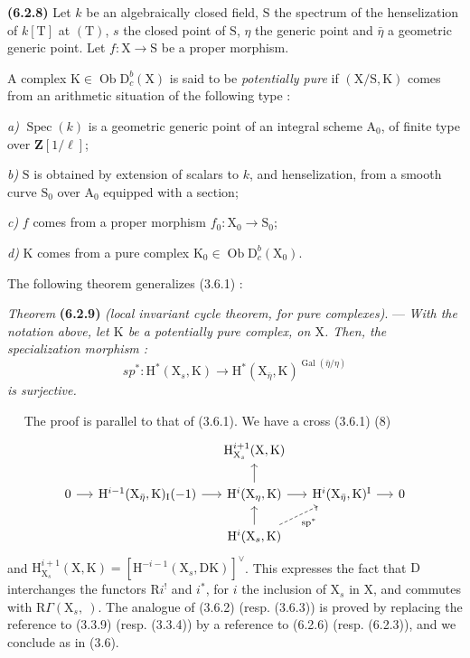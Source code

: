 \documentclass[11pt,leqno]{article}
\newcommand{\Page}[1]{\ifvmode\noindent\else\unskip\ \fi{\footnotesize\textcolor{gray}{[p.\,#1]}}\ \ignorespaces}
\begin{document}
\textbf{(6.2.8)} Let \(k\) be an algebraically closed field,
\(\mathrm{S}\) the spectrum of the henselization of \(k[\mathrm{T}]\) at
\((\mathrm{T})\), \(s\) the closed point of \(\mathrm{S}\), \(\eta\)
the generic point and \(\bar{\eta}\) a geometric generic point.
Let \(f:\mathrm{X}\to\mathrm{S}\) be a proper morphism.

A complex \(\mathrm{K}\in\operatorname{Ob}\mathrm{D}_c^b(\mathrm{X})\)
is said to be \textit{potentially pure} if
\((\mathrm{X}/\mathrm{S},\mathrm{K})\) comes from an arithmetic
situation of the following type :

\textit{a)} \(\operatorname{Spec}(k)\) is a geometric generic
point of an integral scheme \(\mathrm{A}_0\), of finite type over
\(\mathbf{Z}[1/\ell]\);

\textit{b)} \(\mathrm{S}\) is obtained by extension of scalars to
\(k\), and henselization, from a smooth curve \(\mathrm{S}_0\) over
\(\mathrm{A}_0\) equipped with a section;

\textit{c)} \(f\) comes from a proper morphism
\(f_0:\mathrm{X}_0\to\mathrm{S}_0\);

\textit{d)} \(\mathrm{K}\) comes from a pure complex
\(\mathrm{K}_0\in\operatorname{Ob}\mathrm{D}_c^b(\mathrm{X}_0)\).

The following theorem generalizes (3.6.1) :

\textit{Theorem} \textbf{(6.2.9)}
\textit{(local invariant cycle theorem, for pure complexes)}.
— \textit{With the notation above, let \(\mathrm{K}\) be a
potentially pure complex, on \(\mathrm{X}\). Then, the specialization
morphism :}
\[
\mathit{sp}^*:\mathrm{H}^*(\mathrm{X}_s,\mathrm{K})
\to\mathrm{H}^*(\mathrm{X}_{\bar{\eta}},\mathrm{K})^{
\operatorname{Gal}(\bar{\eta}/\eta)}
\]
\textit{is surjective.}

\Page{249}
The proof is parallel to that of (3.6.1). We have a cross (3.6.1) (8)
\[
\begin{tikzcd}[column sep=1.3em, row sep=1.5em]
& & \mathrm{H}^{i+1}_{\mathrm{X}_s}(\mathrm{X},\mathrm{K}) & & \\
0 \arrow[r]
& \mathrm{H}^{i-1}(\mathrm{X}_{\bar{\eta}},\mathrm{K})_{\mathrm{I}}(-1) \arrow[r]
& \mathrm{H}^{i}(\mathrm{X}_{\eta},\mathrm{K}) \arrow[u] \arrow[r]
& \mathrm{H}^{i}(\mathrm{X}_{\bar{\eta}},\mathrm{K})^{\mathrm{I}} \arrow[r]
& 0 \\
& & \mathrm{H}^{i}(\mathrm{X}_s,\mathrm{K})
    \arrow[u]
    \arrow[ur, dashed, "\mathrm{sp}^{*}"']
& &
\end{tikzcd}
\]
and \(\mathrm{H}^{i+1}_{\mathrm{X}_s}(\mathrm{X},\mathrm{K})
=[\mathrm{H}^{-i-1}(\mathrm{X}_s,\mathrm{DK})]^{\vee}\).
This expresses the fact that \(\mathrm{D}\) interchanges the functors \(\mathrm{R}i^!\) and \(i^*\), for \(i\) the inclusion of \(\mathrm{X}_s\) in \(\mathrm{X}\), and commutes with \(\mathrm{R}\Gamma(\mathrm{X}_s,\ )\). The analogue of (3.6.2) (resp. (3.6.3)) is proved by replacing the reference to (3.3.9) (resp. (3.3.4)) by a reference to (6.2.6) (resp. (6.2.3)), and we conclude as in (3.6).
\end{document}
